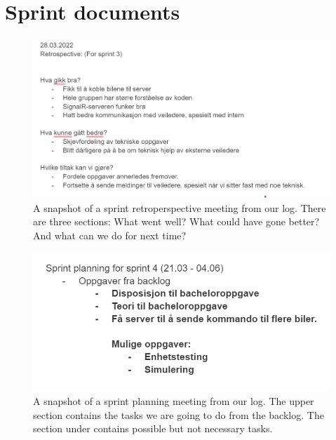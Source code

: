 \chapter{Sprint documents}

\begin{figure}[h!]
	\centering
	\includegraphics[width=1\linewidth]{figures/sprint_retroperspective}
	\caption[Sprint retroperspective]{A snapshot of a sprint retroperspective meeting from our log. There are three sections: What went well? What could have gone better? And what can we do for next time?}
	\label{fig:sprintretroperspective}
\end{figure}

\begin{figure}[h!]
	\centering
	\includegraphics[width=1\linewidth]{figures/sprint_planning}
	\caption[Sprint planning]{A snapshot of a sprint planning meeting from our log. The upper section contains the tasks we are going to do from the backlog. The section under contains possible but not necessary tasks.}
	\label{fig:sprintplanning}
\end{figure}